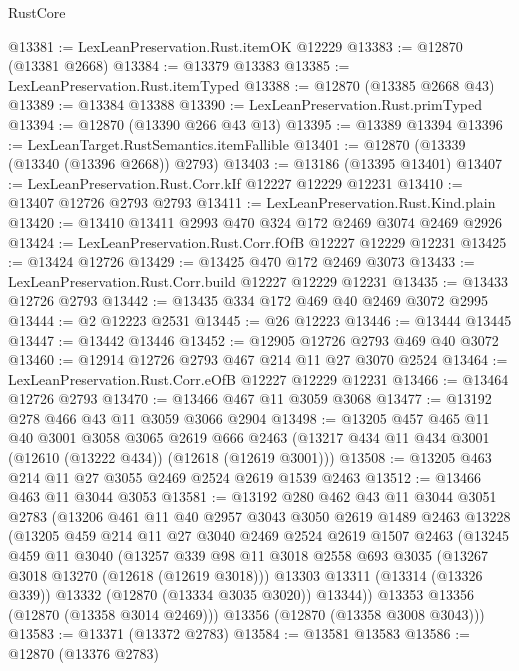 \begin{lexlean}{RustCore}
\begin{coremodule}
@13381 := LexLeanPreservation.Rust.itemOK @12229
@13383 := @12870 (@13381 @2668)
@13384 := @13379 @13383
@13385 := LexLeanPreservation.Rust.itemTyped
@13388 := @12870 (@13385 @2668 @43)
@13389 := @13384 @13388
@13390 := LexLeanPreservation.Rust.primTyped
@13394 := @12870 (@13390 @266 @43 @13)
@13395 := @13389 @13394
@13396 := LexLeanTarget.RustSemantics.itemFallible
@13401 := @12870 (@13339 (@13340 (@13396 @2668)) @2793)
@13403 := @13186 (@13395 @13401)
@13407 := LexLeanPreservation.Rust.Corr.kIf @12227 @12229 @12231
@13410 := @13407 @12726 @2793 @2793
@13411 := LexLeanPreservation.Rust.Kind.plain
@13420 := @13410 @13411 @2993 @470 @324 @172 @2469 @3074 @2469 @2926
@13424 := LexLeanPreservation.Rust.Corr.fOfB @12227 @12229 @12231
@13425 := @13424 @12726
@13429 := @13425 @470 @172 @2469 @3073
@13433 := LexLeanPreservation.Rust.Corr.build @12227 @12229 @12231
@13435 := @13433 @12726 @2793
@13442 := @13435 @334 @172 @469 @40 @2469 @3072 @2995
@13444 := @2 @12223 @2531
@13445 := @26 @12223
@13446 := @13444 @13445
@13447 := @13442 @13446
@13452 := @12905 @12726 @2793 @469 @40 @3072
@13460 := @12914 @12726 @2793 @467 @214 @11 @27 @3070 @2524
@13464 := LexLeanPreservation.Rust.Corr.eOfB @12227 @12229 @12231
@13466 := @13464 @12726 @2793
@13470 := @13466 @467 @11 @3059 @3068
@13477 := @13192 @278 @466 @43 @11 @3059 @3066 @2904
@13498 := @13205
    @457
    @465
    @11
    @40
    @3001
    @3058
    @3065
    @2619
    @666
    @2463
    (@13217 @434 @11 @434 @3001 (@12610 (@13222 @434)) (@12618 (@12619 @3001)))
@13508 := @13205 @463 @214 @11 @27 @3055 @2469 @2524 @2619 @1539 @2463
@13512 := @13466 @463 @11 @3044 @3053
@13581 := @13192
    @280
    @462
    @43
    @11
    @3044
    @3051
    @2783
    (@13206
      @461
      @11
      @40
      @2957
      @3043
      @3050
      @2619
      @1489
      @2463
      @13228
      (@13205
        @459
        @214
        @11
        @27
        @3040
        @2469
        @2524
        @2619
        @1507
        @2463
        (@13245
          @459
          @11
          @3040
          (@13257
            @339
            @98
            @11
            @3018
            @2558
            @693
            @3035
            (@13267 @3018 @13270 (@12618 (@12619 @3018)))
            @13303
            @13311
            (@13314 (@13326 @339))
            @13332
            (@12870 (@13334 @3035 @3020))
            @13344))
        @13353
        @13356
        (@12870 (@13358 @3014 @2469)))
      @13356
      (@12870 (@13358 @3008 @3043)))
@13583 := @13371 (@13372 @2783)
@13584 := @13581 @13583
@13586 := @12870 (@13376 @2783)

\end{coremodule}
\end{lexlean}
